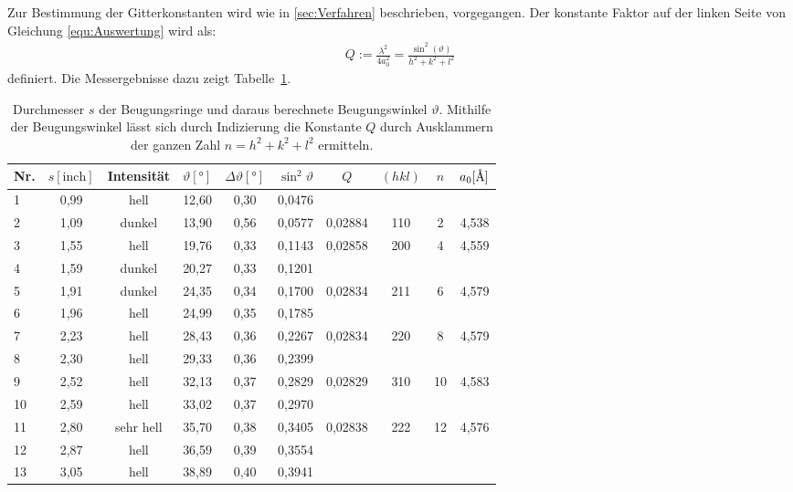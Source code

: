 \documentclass[a4paper,twoside,final]{article}
\begin{document}
Zur Bestimmung der Gitterkonstanten wird wie in \ref{sec:Verfahren} beschrieben, vorgegangen. Der konstante Faktor auf der linken Seite von Gleichung \eqref{equ:Auswertung}
wird als:
\begin{align}
  Q :=\frac{\lambda^2}{4 a_0^2} = \frac{\sin^2(\vartheta)}{h^2 + k^2+l^2}\label{eqn:Q_Parameter}
\end{align} definiert. Die Messergebnisse dazu zeigt Tabelle~\ref{tab:Q_Paramter}.
\begin{table}[ht]
	\centering
	\caption{Durchmesser $s$ der Beugungsringe und daraus berechnete Beugungswinkel $\vartheta$. Mithilfe der Beugungswinkel lässt sich durch Indizierung die Konstante $Q$ durch Ausklammern der ganzen Zahl $n = h^2 +k^2 +l^2$ ermitteln.}
	\label{tab:Q_Paramter}
	\begin{tabular}{l c c c c c | c c c c}
		\toprule
      Nr. & $s [\text{inch}]$ & Intensität & $\vartheta [\si{\degree}]$ & $\Delta \vartheta [\si{\degree}]$ & $\sin^2 \vartheta $ & $Q$ & $(hkl)$ & $n$ & $a_0 [\si{\textup{\AA}}]$\\
    \midrule
1  & 0,99 & hell      & 12,60 & 0,30 & 0,0476 &         &     &    &       \\
2  & 1,09 & dunkel    & 13,90 & 0,56 & 0,0577 & 0,02884 & 110 & 2  & 4,538 \\
3  & 1,55 & hell      & 19,76 & 0,33 & 0,1143 & 0,02858 & 200 & 4  & 4,559 \\
4  & 1,59 & dunkel    & 20,27 & 0,33 & 0,1201 &         &     &    &       \\
5  & 1,91 & dunkel    & 24,35 & 0,34 & 0,1700 & 0,02834 & 211 & 6  & 4,579 \\
6  & 1,96 & hell      & 24,99 & 0,35 & 0,1785 &         &     &    &       \\
7  & 2,23 & hell      & 28,43 & 0,36 & 0,2267 & 0,02834 & 220 & 8  & 4,579 \\
8  & 2,30 & hell      & 29,33 & 0,36 & 0,2399 &         &     &    &       \\
9  & 2,52 & hell      & 32,13 & 0,37 & 0,2829 & 0,02829 & 310 & 10 & 4,583 \\
10 & 2,59 & hell      & 33,02 & 0,37 & 0,2970 &         &     &    &       \\
11 & 2,80 & sehr hell & 35,70 & 0,38 & 0,3405 & 0,02838 & 222 & 12 & 4,576 \\
12 & 2,87 & hell      & 36,59 & 0,39 & 0,3554 &         &     &    &       \\
13 & 3,05 & hell      & 38,89 & 0,40 & 0,3941 &         &     &    &       \\

\end{tabular}
\end{table}
\end{document}
